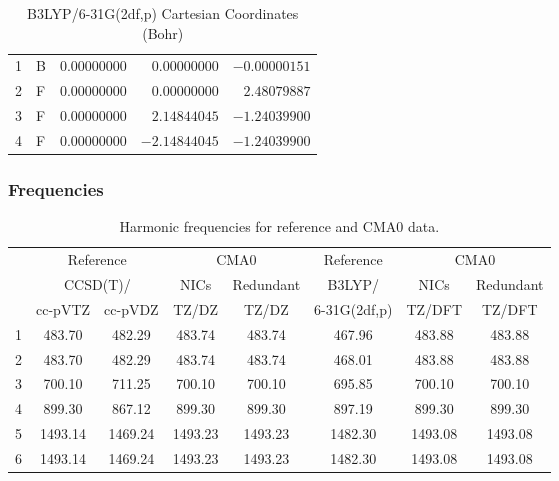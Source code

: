 \documentclass[10pt,oneside]{article}
\begin{document}
\begin{table}[h]
\centering
\caption{B3LYP/6-31G(2df,p) Cartesian Coordinates (Bohr)}
\begin{tabular}{llrrr}
\toprule
1  & B  & $ 0.00000000$ & $ 0.00000000$ & $-0.00000151$ \\
2  & F  & $ 0.00000000$ & $ 0.00000000$ & $ 2.48079887$ \\
3  & F  & $ 0.00000000$ & $ 2.14844045$ & $-1.24039900$ \\
4  & F  & $ 0.00000000$ & $-2.14844045$ & $-1.24039900$ \\
\bottomrule
\end{tabular}
\end{table}

\begin{table}[h!]
\subsubsection*{Frequencies}
\centering
\caption{Harmonic frequencies for reference and CMA0 data.}
\begin{tabular}{cccccccc}
\toprule
{} & \multicolumn{2}{c}{Reference} & \multicolumn{2}{c}{CMA0} &    Reference & \multicolumn{2}{c}{CMA0} \\
{} & \multicolumn{2}{c}{CCSD(T)/} &    NICs &  Redundant &       B3LYP/ &    NICs & Redundant \\
{} &   cc-pVTZ & cc-pVDZ &   TZ/DZ &      TZ/DZ & 6-31G(2df,p) &  TZ/DFT &    TZ/DFT \\
\midrule
1 &    483.70 &  482.29 &  483.74 &     483.74 &       467.96 &  483.88 &    483.88 \\
2 &    483.70 &  482.29 &  483.74 &     483.74 &       468.01 &  483.88 &    483.88 \\
3 &    700.10 &  711.25 &  700.10 &     700.10 &       695.85 &  700.10 &    700.10 \\
4 &    899.30 &  867.12 &  899.30 &     899.30 &       897.19 &  899.30 &    899.30 \\
5 &   1493.14 & 1469.24 & 1493.23 &    1493.23 &      1482.30 & 1493.08 &   1493.08 \\
6 &   1493.14 & 1469.24 & 1493.23 &    1493.23 &      1482.30 & 1493.08 &   1493.08 \\
\bottomrule
\end{tabular}
\end{table}
\end{document}
